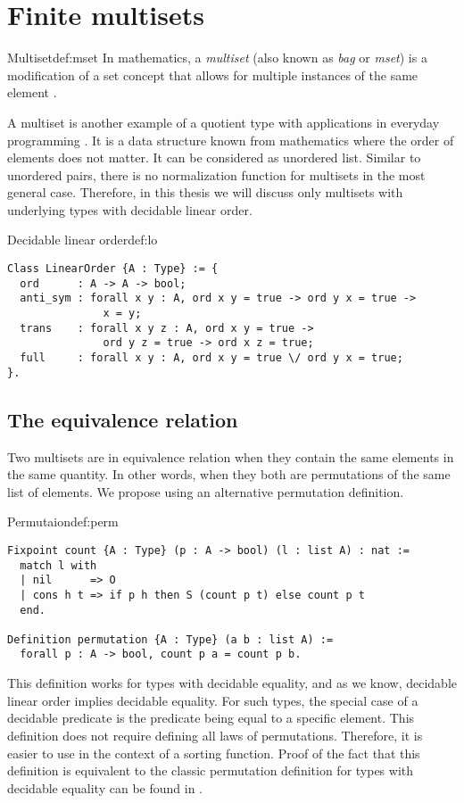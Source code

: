 \section{Finite multisets}
\begin{defi}{Multiset}{def:mset}
In mathematics, a \emph{multiset} (also known as \emph{bag} or \emph{mset}) is a modification of a set concept that allows for multiple instances of the same element \cite{SetTheorey}.
\end{defi}
A multiset is another example of a quotient type with applications in everyday programming \cite{MSetApplic}. It is a data structure known from mathematics where the order of elements does not matter. It can be considered as unordered list. Similar to unordered pairs, there is no normalization function for multisets in the most general case. Therefore, in this thesis we will discuss only multisets with underlying types with decidable linear order.
\begin{defi}{Decidable linear order}{def:lo}
\begin{verbatim}
Class LinearOrder {A : Type} := {
  ord      : A -> A -> bool;
  anti_sym : forall x y : A, ord x y = true -> ord y x = true ->
               x = y;
  trans    : forall x y z : A, ord x y = true -> 
               ord y z = true -> ord x z = true;
  full     : forall x y : A, ord x y = true \/ ord y x = true;
}.
\end{verbatim}
\end{defi}
\subsection{The equivalence relation}
Two multisets are in equivalence relation when they contain the same elements in the same quantity. In other words, when they both are permutations of the same list of elements. We propose using an alternative permutation definition. 
\begin{defi}{Permutaion}{def:perm}
\begin{verbatim}
Fixpoint count {A : Type} (p : A -> bool) (l : list A) : nat :=
  match l with
  | nil      => O
  | cons h t => if p h then S (count p t) else count p t
  end.

Definition permutation {A : Type} (a b : list A) :=
  forall p : A -> bool, count p a = count p b.
\end{verbatim}
\end{defi}
This definition works for types with decidable equality, and as we know, decidable linear order implies decidable equality. For such types, the special case of a decidable predicate is the predicate being equal to a specific element. This definition does not require defining all laws of permutations. Therefore, it is easier to use in the context of a sorting function. Proof of the fact that this definition is equivalent to the classic permutation definition for types with decidable equality can be found in .
